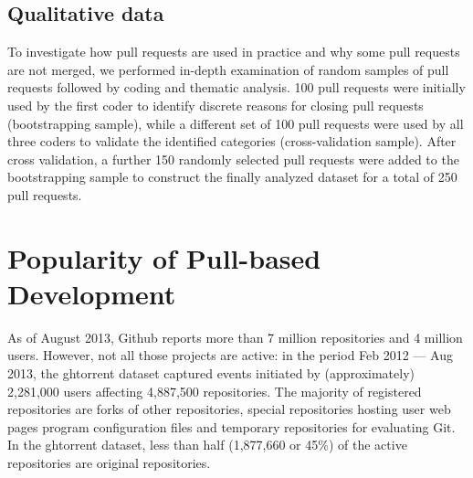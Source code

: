 \documentclass{sig-alternate}
\begin{document}
\subsection{Qualitative data}
\label{sec:qualdata}
To investigate how pull requests are used in practice and why some pull requests
are not merged, we performed in-depth examination of random samples of pull
requests followed by coding and thematic analysis. 100 pull requests were initially
used by the first coder to identify discrete reasons for closing pull requests
(bootstrapping sample), while a different set of 100 pull requests were used by
all three coders to validate the identified categories (cross-validation
sample). After cross validation, a further 150 randomly selected pull requests
were added to the bootstrapping sample to construct the finally analyzed
dataset for a total of 250 pull requests.


\section{Popularity of Pull-based Development}
\label{sec:github}
%


As of August 2013, Github reports
more than 7 million repositories and 4 million users. However, not all those
projects are active: in the period Feb 2012 --- Aug 2013, the {\sc ght}orrent dataset captured events initiated by
(approximately) 2,281,000 users affecting 4,887,500 repositories. The majority
of registered repositories are forks of other repositories, special repositories
hosting user web pages 
program
configuration files 
and temporary repositories for evaluating Git. 
In the {\sc ght}orrent dataset, less than half
(1,877,660 or 45\%) of the active repositories are original repositories.
\end{document}
